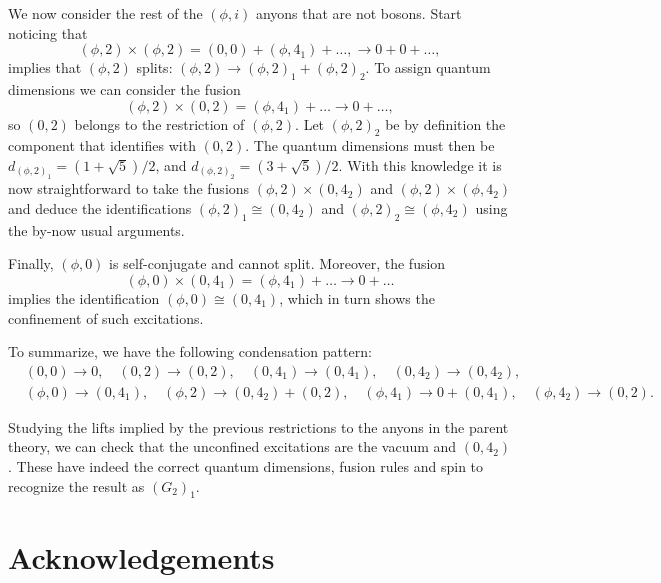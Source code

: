 \documentclass[11pt]{article}
\numberwithin{equation}{section}
\begin{document}
We now consider the rest of the $(\phi,i)$ anyons that are not bosons. Start noticing that
\begin{equation}
    (\phi, 2) \times (\phi, 2) = (0,0) + (\phi, 4_{1}) + \ldots, \longrightarrow0+0+\ldots,
\end{equation}
implies that $(\phi, 2)$ splits: $(\phi, 2) \to (\phi, 2)_{1} + (\phi, 2)_{2}$. To assign quantum dimensions we can consider the fusion
\begin{equation}
    (\phi,2) \times (0,2) = (\phi,4_{1}) + \ldots \longrightarrow 0 + \ldots,
\end{equation}
so $(0,2)$ belongs to the restriction of $(\phi,2)$. Let $(\phi, 2)_{2}$ be by definition the component that identifies with $(0,2)$. The quantum dimensions must then be $d_{(\phi,2)_{1}} = (1 + \sqrt{5})/2$, and $d_{(\phi,2)_{2}} = (3 + \sqrt{5})/2$. With this knowledge it is now straightforward to take the fusions $(\phi,2) \times (0,4_{2})$ and $(\phi,2) \times (\phi,4_{2})$ and deduce the identifications $(\phi,2)_{1} \cong (0,4_{2})$ and $(\phi,2)_{2} \cong (\phi,4_{2})$ using the by-now usual arguments. 


Finally, $(\phi,0)$ is self-conjugate and cannot split. Moreover, the fusion
\begin{equation}
   (\phi,0) \times (0,4_{1}) = (\phi,4_{1}) + \ldots \to 0+\ldots
\end{equation}
implies the identification $(\phi,0) \cong (0,4_{1})$, which in turn shows the confinement of such excitations. 

To summarize, we have the following condensation pattern:
\begin{align}
    &(0,0) \to 0, \quad (0,2) \to (0,2), \quad (0,4_{1}) \to(0,4_{1}), \quad (0,4_{2}) \to (0,4_{2}), \\[0.3cm] &(\phi, 0) \to (0,4_{1}), \quad (\phi,2) \to (0,4_{2}) + (0,2), \quad (\phi,4_{1}) \to 0 + (0,4_{1}), \quad (\phi,4_{2}) \to (0,2).
\end{align}

Studying the lifts implied by the previous restrictions to the anyons in the parent theory, we can check that the unconfined excitations are the vacuum and $(0,4_{2})$. These have indeed the correct quantum dimensions, fusion rules and spin to recognize the result as $(G_{2})_{1}$.


\section*{Acknowledgements}
\end{document}
